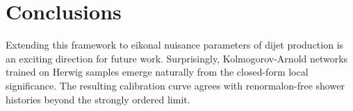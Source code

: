 \section{Conclusions}\label{sec:conclusions}

Extending this framework to eikonal nuisance parameters of dijet
production is an exciting direction for future work. Surprisingly,
Kolmogorov-Arnold networks trained on Herwig samples emerge naturally
from the closed-form local significance. The resulting calibration curve
agrees with renormalon-free shower histories beyond the strongly ordered
limit.

